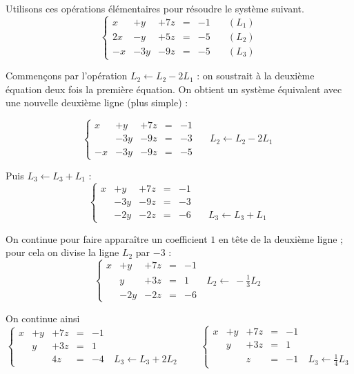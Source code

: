 \documentclass[class=report,crop=false]{standalone}
\begin{document}
\begin{exemple}
Utilisons ces opérations élémentaires pour résoudre le système suivant.
\[ \left\{
\begin{array}{cccccr}
x  & + y & +7z & = & -1 & {\scriptstyle \quad (L_1)}\\
2x & - y & +5z & = & -5 & {\scriptstyle \quad (L_2)}\\
-x & -3y & -9z & = & -5 & {\scriptstyle \quad (L_3)}
\end{array} \right.
\]

Commençons par l'opération $L_2 \leftarrow L_2 - 2L_1$ :
on soustrait à la deuxième équation deux fois la première équation.
On obtient un système équivalent avec une nouvelle deuxième ligne (plus simple) :

\[ \left\{
\begin{array}{cccccr}
x  & + y & +7z & = & -1 & \\
   & -3y & -9z & = & -3 & {\scriptstyle \quad L_2 \leftarrow L_2 - 2L_1}\\
-x & -3y & -9z & = & -5 &
\end{array} \right.
\]

Puis $L_3 \leftarrow L_3 + L_1$ :
\[ \left\{
\begin{array}{cccccr}
x  & + y & +7z & = & -1 & \\
   & -3y & -9z & = & -3 & \\
   & -2y & -2z & = & -6 & {\scriptstyle \quad L_3 \leftarrow L_3 + L_1}
\end{array} \right.
\]


On continue pour faire apparaître un coefficient $1$ en tête de la deuxième ligne ;
pour cela on divise la ligne $L_2$ par $-3$ :
\[ \left\{
\begin{array}{cccccr}
x  & + y & +7z & = & -1 & \\
   &  y  & +3z & = & 1 & {\scriptstyle \  L_2 \leftarrow \ -\frac13 L_2}\\
   & -2y & -2z & = & -6 &
\end{array} \right.
\]

On continue ainsi
\[ \left\{
\begin{array}{cccccr}
x  & + y & +7z & = & -1 & \\
   &  y  & +3z & = & 1 & \\
   &     & 4z  & = & -4& {\scriptstyle \  L_3 \leftarrow L_3+2 L_2}
\end{array} \right.
\qquad
\left\{
\begin{array}{cccccr}
x  & + y & +7z & = & -1 & \\
   &  y  & +3z & = & 1 & \\
   &     & z  & = & -1& {\scriptstyle \ L_3 \leftarrow \frac14L_3}
\end{array} \right.
\]


\end{exemple}
\end{document}
